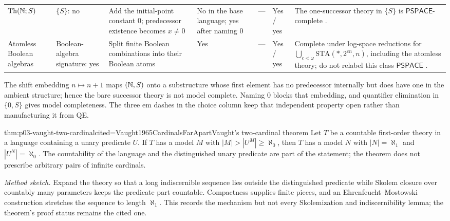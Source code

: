\begin{landscape}
\begin{longtable}{@{}p{.65in}p{1.10in}p{1.20in}p{.60in}p{.70in}p{.80in}p{2.10in}@{}}
\addlinespace
\(\operatorname{Th}(\mathbb{N};S)\) & \(\{S\}\): no & Add the initial-point constant \(0\); predecessor existence becomes \(x\ne0\) & No in the base language; yes after naming \(0\) & --- & Yes / yes & The one-successor theory in \(\{S\}\) is \(\mathsf{PSPACE}\)-complete \cite{FerranteRackoff1979}. \\
\addlinespace
Atomless Boolean algebras & Boolean-algebra signature: yes & Split finite Boolean combinations into their Boolean atoms & Yes & --- & Yes / yes & Complete under log-space reductions for \(\bigcup_{c<\omega}\mathrm{STA}(*,2^{cn},n)\), including the atomless theory; do not relabel this class \(\mathsf{PSPACE}\) \cite{Kozen1980}. \\
\bottomrule
\end{longtable}
\endgroup
\end{landscape}

The shift embedding \(n\mapsto n+1\) maps \((\mathbb{N},S)\) onto a substructure
whose first element has no predecessor internally but does have one in the
ambient structure; hence the bare successor theory is not model complete.
Naming \(0\) blocks that embedding, and quantifier elimination in
\(\{0,S\}\) gives model completeness.  The three em dashes in the choice
column keep that independent property open rather than manufacturing it from
QE.


\begin{hbtheorem}{thm:p03-vaught-two-cardinal}{cited=Vaught1965CardinalsFarApart}{Vaught's two-cardinal theorem}
Let \(T\) be a countable first-order theory in a language containing a unary
predicate \(U\). If \(T\) has a model \(M\) with
\(|M|>|U^M|\ge\aleph_0\), then \(T\) has a model \(N\) with
\(|N|=\aleph_1\) and \(|U^N|=\aleph_0\). The countability of the language and
the distinguished unary predicate are part of the statement; the theorem does
not prescribe arbitrary pairs of infinite cardinals.
\end{hbtheorem}

\noindent\emph{Method sketch.}
Expand the theory so that a long indiscernible sequence lies outside the
distinguished predicate while Skolem closure over countably many parameters
keeps the predicate part countable. Compactness supplies finite pieces, and an
Ehrenfeucht--Mostowski construction stretches the sequence to length
\(\aleph_1\). This records the mechanism but not every Skolemization and
indiscernibility lemma; the theorem's proof status remains the cited one.


